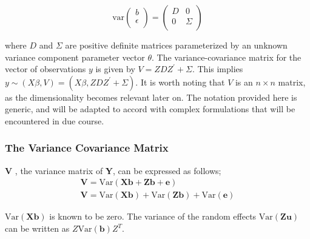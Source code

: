 \documentclass[12pt, a4paper]{report}
\theoremstyle{plain}
\theoremstyle{definition}
\theoremstyle{remark}
\begin{document}
	\[
	\mathrm{var}
	\left(
	\begin{array}{c}
	b \\
	\epsilon \\
	\end{array}
	\right)
	=
	\left(
	\begin{array}{cc}
	D & 0 \\
	0 & \Sigma \\
	\end{array}
	\right)
	\]
	
	
	
	
	where $D$ and $\Sigma$ are positive definite matrices parameterized by an unknown variance component parameter vector $ \theta.$ The variance-covariance matrix for the vector of observations $y$ is given by $V = ZDZ^{\prime}+ \Sigma.$ This implies $y \sim(X\beta, V) = (X\beta,ZDZ^{\prime}+ \Sigma)$. It is worth noting that $V$ is an $n \times n$ matrix, as the dimensionality becomes relevant later on. The notation provided here is generic, and will be adapted to accord with complex formulations that will be encountered in due course.
	
	
	
	
	\subsubsection{The Variance Covariance Matrix}
	\textbf{V} , the variance matrix of \textbf{Y}, can be expressed
	as follows;
	\begin{eqnarray}
	\textbf{V}= \textrm{Var} ( \textbf{Xb} + \textbf{Zb} + \textbf{e})\\
	\textbf{V}= \textrm{Var} ( \textbf{Xb} ) + \textrm{Var} (\textbf{Zb}) +
	\textrm{Var}(\textbf{e})
	\end{eqnarray}
	
	$\mbox{Var}(\textbf{Xb})$ is known to be zero. The variance of the
	random effects $\mbox{Var}(\textbf{Zu})$ can be written as
	$Z\mbox{Var}(\textbf{b})Z^{T}$.
	
\end{document}
